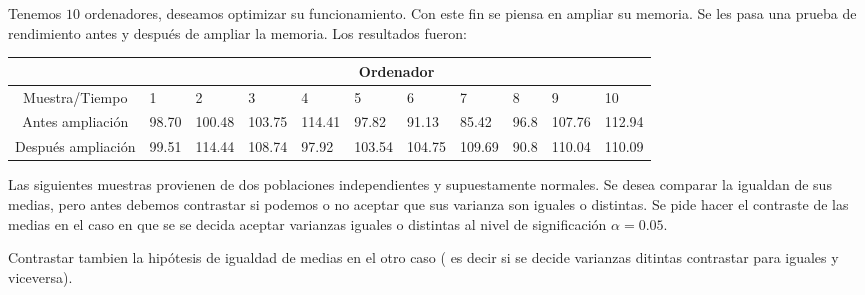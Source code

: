 \documentclass[12pt]{article}
\begin{document}
\begin{prob}  Tenemos $10$ ordenadores, deseamos optimizar su funcionamiento. Con este fin  se piensa en ampliar su memoria. Se les pasa una prueba de rendimiento antes  y después de  ampliar la memoria. Los resultados fueron:

\scriptsize{
\begin{tabular}{|c|llllllllll|}
\hline
 &\multicolumn{10}{|c|}{Ordenador} \\\hline
Muestra\slash Tiempo & 1 & 2 & 3 & 4 & 5 & 6 & 7 & 8 & 9 & 10\\\hline
Antes ampliación & 98.70 & 100.48 & 103.75 & 114.41 & 97.82&
91.13 & 85.42 & 96.8 & 107.76 & 112.94\\
\hline
Después ampliación & 99.51 & 114.44 & 108.74 & 97.92 & 103.54&
104.75 & 109.69 & 90.8 & 110.04 & 110.09\\

\hline
\end{tabular}
}
\end{prob}


\begin{prob} Las siguientes muestras provienen de dos poblaciones independientes y supuestamente normales.  Se desea comparar la igualdan de sus medias, pero antes debemos contrastar si podemos o no aceptar que sus varianza son iguales o distintas. Se pide hacer el contraste de las medias en el caso en que se se decida aceptar varianzas iguales o distintas al nivel de significación $\alpha=0.05$.





Contrastar tambien la hipótesis de igualdad de medias en el otro caso ( es decir si se decide varianzas ditintas contrastar para iguales y viceversa).


\end{prob}



\end{document}
